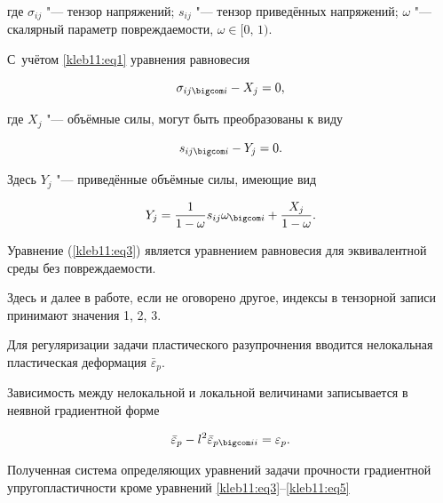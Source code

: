 где $\sigma_{ij}$ "--- тензор напряжений; $s_{ij}$ "--- тензор приведённых напряжений; $\omega$ "--- скалярный параметр повреждаемости, $\omega \in [0,\,1)$.

С~учётом \eqref{kleb11:eq1} уравнения равновесия

\begin{equation}

\label{kleb11:eq2}

\sigma_{ij\bigcom i} - X_j =0, 

\end{equation}

где $X_j$ "--- объёмные силы, могут быть преобразованы к виду

\begin{equation}

\label{kleb11:eq3}

s_{ij \bigcom i} - Y_j =0.

\end{equation}

Здесь $Y_j$ "--- приведённые объёмные силы, имеющие вид

\begin{equation}

\label{kleb11:eq4}

Y_j = \frac{1}{1 - \omega} s_{ij} \omega_{\bigcom i}+\frac{X_j}{1-\omega}.

\end{equation}

Уравнение (\ref{kleb11:eq3}) является уравнением равновесия для эквивалентной среды без повреждаемости.

Здесь и далее в работе, если не оговорено другое,  индексы в тензорной записи принимают значения 1, 2, 3.



Для регуляризации задачи пластического разупрочнения вводится нелокальная пластическая деформация $\bar{\varepsilon}_p$.

Зависимость между нелокальной и локальной величинами записывается в неявной градиентной форме

\begin{equation}

\label{kleb11:eq5}

\bar{\varepsilon}_p-l^2\bar{\varepsilon}_{p \bigcom ii}=\varepsilon_p.

\end{equation}



Полученная система определяющих уравнений задачи прочности градиентной упругопластичности кроме уравнений \eqref{kleb11:eq3}--\eqref{kleb11:eq5}

